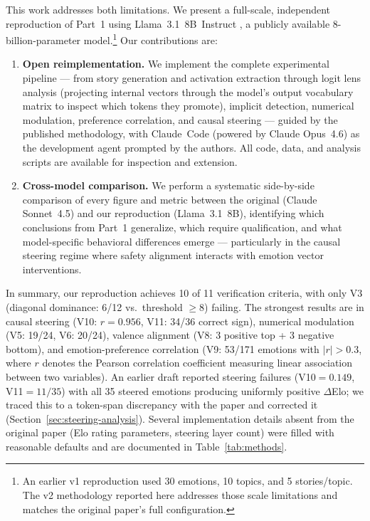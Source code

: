\documentclass[11pt,a4paper]{article}
\begin{document}
This work addresses both limitations.  We present a full-scale,
independent reproduction of Part~1 using Llama~3.1~8B~Instruct \citep{llama31}, a
publicly available 8-billion-parameter model.\footnote{An earlier v1
reproduction used 30 emotions, 10 topics, and 5 stories/topic.  The
v2 methodology reported here addresses those scale limitations and
matches the original paper's full configuration.}  Our contributions
are:
\begin{enumerate}[nosep]
  \item \textbf{Open reimplementation.}  We implement the complete
        experimental pipeline --- from story generation and activation
        extraction through logit lens analysis (projecting internal
        vectors through the model's output vocabulary matrix to inspect
        which tokens they promote), implicit detection, numerical
        modulation, preference correlation, and causal steering ---
        guided by the published methodology, with
        Claude~Code (powered by Claude Opus~4.6) as the development
        agent prompted by the authors.
        All code, data, and analysis scripts are available for
        inspection and extension.
  \item \textbf{Cross-model comparison.}  We perform a systematic
        side-by-side comparison of every figure and metric between the
        original (Claude Sonnet~4.5) and our reproduction
        (Llama~3.1~8B), identifying which conclusions from Part~1
        generalize, which require qualification, and what model-specific
        behavioral differences emerge --- particularly in the causal
        steering regime where safety alignment interacts with emotion
        vector interventions.
\end{enumerate}

In summary, our reproduction achieves 10 of 11 verification criteria,
with only V3 (diagonal dominance: 6/12 vs.\ threshold $\geq$8)
failing.  The strongest results are in causal steering
(V10: $r{=}0.956$, V11: 34/36 correct sign), numerical modulation
(V5: 19/24, V6: 20/24), valence alignment (V8: 3 positive top + 3
negative bottom), and emotion-preference correlation (V9: 53/171
emotions with $|r|>0.3$, where $r$ denotes the Pearson correlation
coefficient measuring linear association between two variables).
An earlier draft reported steering failures (V10$=0.149$, V11$=11/35$)
with all 35 steered emotions producing uniformly positive $\Delta$Elo;
we traced this to a token-span discrepancy with the paper and
corrected it (Section~\ref{sec:steering-analysis}).  Several
implementation details absent from the original paper (Elo rating
parameters, steering layer count) were filled with reasonable defaults
and are documented in Table~\ref{tab:methods}.
\end{document}

